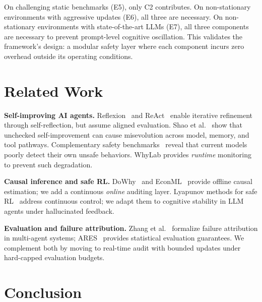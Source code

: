 \documentclass{article}
\begin{document}
On challenging static benchmarks (E5), only C2 contributes.
On non-stationary environments with aggressive updates (E6),
all three are necessary.
On non-stationary environments with state-of-the-art LLMs (E7),
all three components are necessary to prevent prompt-level
cognitive oscillation.
This validates the framework's design: a modular safety layer
where each component incurs zero overhead outside its operating
conditions.


\section{Related Work}
\label{sec:related}

\textbf{Self-improving AI agents.}
Reflexion~\cite{shinn2023reflexion} and ReAct~\cite{yao2023react}
enable iterative refinement through self-reflection, but assume
aligned evaluation. Shao et al.~\cite{misevolution2025} show that
unchecked self-improvement can cause misevolution across model,
memory, and tool pathways. Complementary safety
benchmarks~\cite{rjudge2024,agentharm2025} reveal that current models
poorly detect their own unsafe behaviors. WhyLab provides
\emph{runtime} monitoring to prevent such degradation.

\textbf{Causal inference and safe RL.}
DoWhy~\cite{dowhy2020} and EconML~\cite{econml2019} provide offline
causal estimation; we add a continuous \emph{online} auditing layer.
Lyapunov methods for safe RL~\cite{chow2018lyapunov,berkenkamp2017safe}
address continuous control; we adapt them to cognitive stability
in LLM agents under hallucinated feedback.

\textbf{Evaluation and failure attribution.}
Zhang et al.~\cite{zhang2025whowhen} formalize failure attribution in
multi-agent systems; ARES~\cite{saadfalcon2024ares} provides statistical
evaluation guarantees. We complement both by moving to real-time audit
with bounded updates under hard-capped evaluation budgets.


\section{Conclusion}
\label{sec:conclusion}

\end{document}
